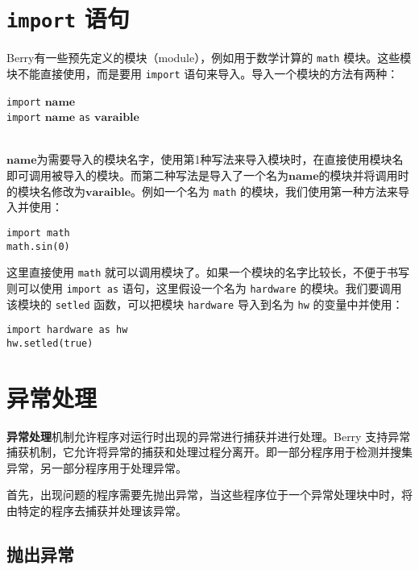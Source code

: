 \section{\texttt{import} 语句}

Berry有一些预先定义的模块（module），例如用于数学计算的 \texttt{math} 模块。这些模块不能直接使用，而是要用 \texttt{import} 语句来导入。导入一个模块的方法有两种：
\begin{algorithm}
    \texttt{import} $\bm{name}$ \\
    \texttt{import} $\bm{name}$ \texttt{as} $\bm{varaible}$
\end{algorithm}\vspace{-0.6em}\\
$\bm{name}$为需要导入的模块名字，使用第1种写法来导入模块时，在直接使用模块名即可调用被导入的模块。而第二种写法是导入了一个名为$\bm{name}$的模块并将调用时的模块名修改为$\bm{varaible}$。例如一个名为 \texttt{math} 的模块，我们使用第一种方法来导入并使用：
\begin{lstlisting}[language=berry, numbers=none]
import math
math.sin(0)
\end{lstlisting}
这里直接使用 \texttt{math} 就可以调用模块了。如果一个模块的名字比较长，不便于书写则可以使用 \texttt{import as} 语句，这里假设一个名为 \texttt{hardware} 的模块。我们要调用该模块的 \texttt{setled} 函数，可以把模块 \texttt{hardware} 导入到名为 \texttt{hw} 的变量中并使用：
\begin{lstlisting}[language=berry, numbers=none]
import hardware as hw
hw.setled(true)
\end{lstlisting}

\section{异常处理}

\textbf{异常处理}机制允许程序对运行时出现的异常进行捕获并进行处理。Berry 支持异常捕获机制，它允许将异常的捕获和处理过程分离开。即一部分程序用于检测并搜集异常，另一部分程序用于处理异常。

首先，出现问题的程序需要先抛出异常，当这些程序位于一个异常处理块中时，将由特定的程序去捕获并处理该异常。

\subsection{抛出异常}

